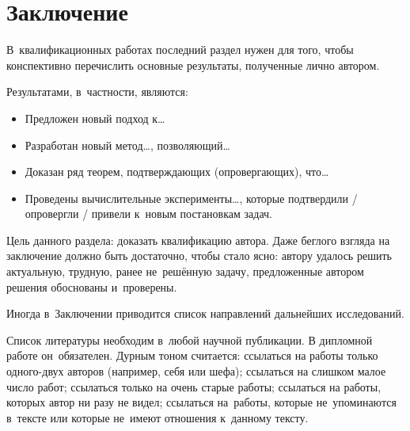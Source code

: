 \documentclass[12pt,fleqn]{article}
\begin{document}
\section{Заключение}

В~квалификационных работах последний раздел нужен для того, чтобы 
конспективно перечислить основные результаты, полученные лично автором. 

Результатами, в~частности, являются:
\begin{itemize}
\item 
    Предложен новый подход к\dots
\item 
    Разработан новый метод\dots, позволяющий\dots
\item 
    Доказан ряд теорем, подтверждающих (опровергающих), что\dots
\item 
    Проведены вычислительные эксперименты\dots,
    которые подтвердили / опровергли / привели к~новым постановкам задач.
\end{itemize}
    
Цель данного раздела: доказать квалификацию автора. 
Даже беглого взгляда на заключение должно быть достаточно, чтобы стало ясно: 
автору удалось решить актуальную, трудную, ранее не~решённую задачу, 
предложенные автором решения обоснованы и~проверены.

Иногда в~Заключении приводится список направлений дальнейших исследований.

\newpage
Список литературы необходим в~любой научной публикации. 
В дипломной работе он~обязателен. 
Дурным тоном считается:
ссылаться на работы только одного-двух авторов (например, себя или шефа);
ссылаться на слишком малое число работ;
ссылаться только на очень старые работы;
ссылаться на работы, которых автор ни разу не видел;
ссылаться на~работы, которые не~упоминаются в~тексте
или которые не~имеют отношения к~данному тексту.

\renewcommand{\bibname}{Список литературы}
\addcontentsline{toc}{section}{\bibname}

\nocite{hastie09elements,bishop06pattern,zhuravlev06recognition,zhuravlev78prob33,shlezinger04ten,boucheron05theory}

\def\BibUrl#1.{}\def\BibAnnote#1.{}


\end{document}
